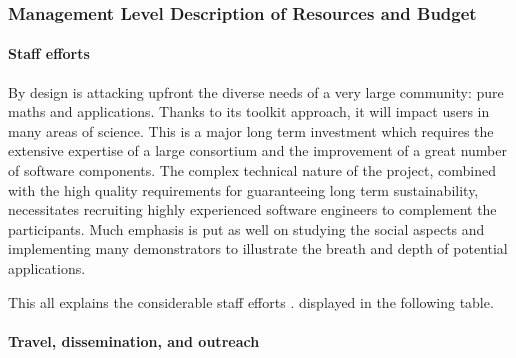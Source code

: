 

\subsubsection{Management Level Description of Resources and Budget}
\label{sect:budget-details}

\paragraph{Staff efforts}


By design \TheProject is attacking upfront the diverse needs of a
very large community: pure maths and applications. Thanks to its
toolkit approach, it will impact users in many areas of science. This
is a major long term investment which requires the extensive expertise
of a large consortium and the improvement of a great number of
software components. The complex technical nature of the project,
combined with the high quality requirements for guaranteeing long term
sustainability, necessitates recruiting highly experienced software
engineers to complement the participants. Much emphasis is put as well
on studying the social aspects and implementing many demonstrators to
illustrate the breath and depth of potential applications.

This all explains the considerable staff efforts%
\ifgrantagreement.\else %
displayed in the following table.
\wpfig[label=fig:staffeffort,caption=Summary of Staff Efforts]
\fi

\paragraph{Travel, dissemination, and outreach}

